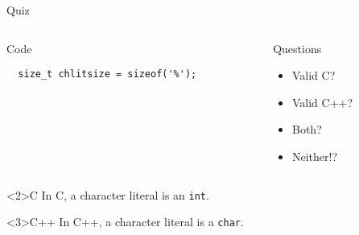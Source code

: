 \documentclass[presentation,aspectratio=169]{beamer}
\begin{document}
\begin{frame}[fragile,label={sec:org23c4234}]{Quiz}
\begin{columns}
\begin{column}{0.48\columnwidth}
\begin{block}{Code}
\begin{verbatim}
  size_t chlitsize = sizeof('%');
\end{verbatim}
\end{block}
\end{column}

\begin{column}{0.48\columnwidth}
\begin{block}{Questions}
\begin{itemize}
\item Valid C?
\item Valid C++?
\item Both?
\item Neither!?
\end{itemize}
\end{block}
\end{column}
\end{columns}

\begin{block}<2>{C}
In C, a character literal is an \texttt{int}.
\end{block}

\vspace{-1cm}
\begin{block}<3>{C++}
In C++, a character literal is a \texttt{char}.
\end{block}
\end{frame}

\end{document}
